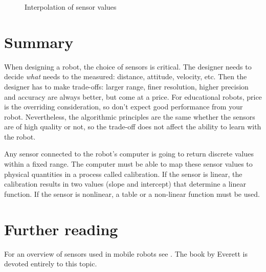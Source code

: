 \begin{figure}
\begin{center}
\caption{Interpolation of sensor values}\label{fig.interpolation}
\end{center}
\end{figure}

\section{Summary}

When designing a robot, the choice of sensors is critical. The designer needs to decide \emph{what} needs to the measured: distance, attitude, velocity, etc. Then the designer has to make trade-offs: larger range, finer resolution, higher precision and accuracy are always better, but come at a price. For educational robots, price is the overriding consideration, so don't expect good performance from your robot. Nevertheless, the algorithmic principles are the same whether the sensors are of high quality or not, so the trade-off does not affect the ability to learn with the robot.

Any sensor connected to the robot's computer is going to return discrete values within a fixed range. The computer must be able to map these sensor values to physical quantities in a process called calibration. If the sensor is linear, the calibration results in two values (slope and intercept) that determine a linear function. If the sensor is nonlinear, a table or a non-linear function must be used.


\section{Further reading}

For an overview of sensors used in mobile robots see \cite[Section 4.1]{siegwart}. The book by Everett \cite{everett} is devoted entirely to this topic.



